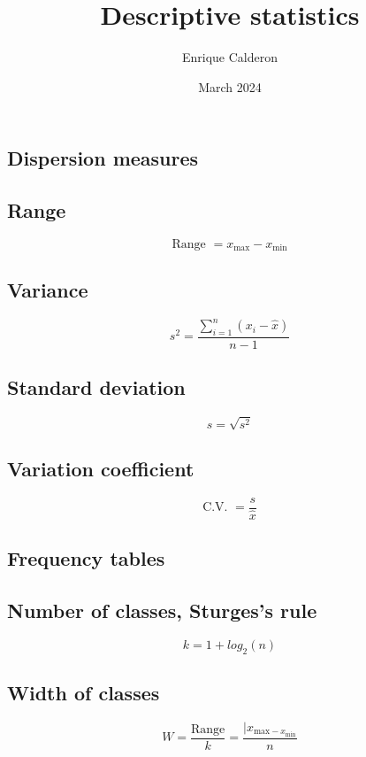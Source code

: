 \documentclass[letterpaper]{article}
\title{Descriptive statistics}
\author{Enrique Calderon}
\date{March 2024}
\newcommand{\divline}{\noindent\makebox[\linewidth]{\rule{\textwidth}{0.4pt}}}
\begin{document}
    \maketitle

    \divline
    \begin{multicols}{2}
        \section{Dispersion measures}

        \subsection{Range}
        
        \[\text{Range } = x_{\text{max}} - x_{\text{min}} \]

        \subsection{Variance}

        \[s^{2} = \frac{\sum_{i=1}^{n} (x_{i} - \hat{x})}{n-1} \]

        \subsection{Standard deviation}

        \[s = \sqrt{s^{2}}\]

        \subsection{Variation coefficient}

        \[\text{C.V. } = \frac{s}{\hat{x}}\]

    \end{multicols}

    \divline
    \begin{multicols}{2}
        \section{Frequency tables}

        \subsection{Number of classes, Sturges's rule}

        \[k = 1 + log_{2}(n)\]

        \subsection{Width of classes}

        \[W = \frac{\text{Range}}{k} = \frac{|x_{\text{max} - x_{\text{min}}}}{n}\]
        
    \end{multicols}
\end{document}
